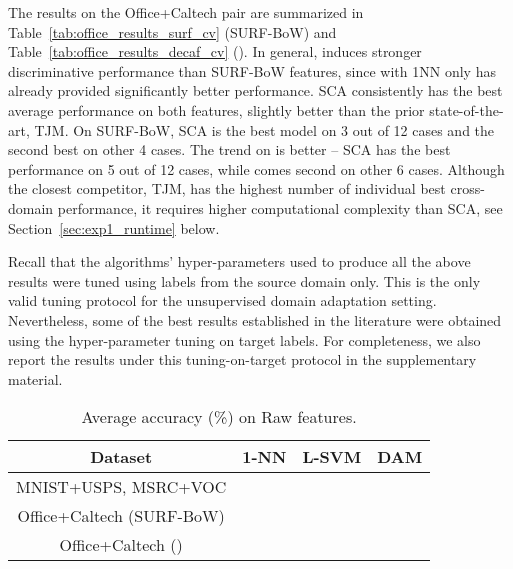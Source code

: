 \documentclass[10pt,journal,compsoc]{IEEEtran}
\begin{document}
The results on the Office+Caltech pair are summarized in Table~\ref{tab:office_results_surf_cv} (SURF-BoW) and Table~\ref{tab:office_results_decaf_cv} ().
In general,  induces stronger discriminative performance than SURF-BoW features, since  with 1NN only has already provided significantly better performance.
SCA consistently has the best average performance on both features, slightly better than the prior state-of-the-art, TJM. 
On SURF-BoW, SCA is the best model on 3 out of 12 cases and the second best on other 4 cases.
The trend on  is better -- SCA has the best performance on 5 out of 12 cases, while comes second on other 6 cases.
Although the closest competitor, TJM, has the highest number of individual best cross-domain performance, it requires higher computational complexity than SCA, see Section~\ref{sec:exp1_runtime} below.



Recall that the algorithms' hyper-parameters used to produce all the above results were tuned using labels from the source domain only.
This is the only valid tuning protocol for the unsupervised domain adaptation setting.
Nevertheless, some of the best results established in the literature were obtained using the hyper-parameter tuning on target labels.
For completeness, we also report the results under this tuning-on-target protocol in the supplementary material.


\begin{figure*}[htp]
	\centering
	 \label{fig:digobj}\quad
	 \label{fig:office_surf} \quad
	 \label{fig:office_decaf}
	\caption{L-SVM and DAM average performance accuracy (\%) relative to the performance on Raw features. The numbers on the top or bottom of the bars show the absolute accuracy. 
	The red line indicates the Raw baseline performance, see Table \ref{tab:raw_summ} for the exact numbers.
	}
	\label{fig:svm_dam}
\end{figure*}

\vspace{-1em}
\begin{table}[!htb]
\centering
\caption{Average accuracy (\%) on Raw features.}
\vspace{-1em}
\begin{tabular}{| c || c | c | c  | }
\hline
Dataset & 1-NN & L-SVM & DAM \\
\hline
MNIST+USPS, MSRC+VOC &  &  &  \\
Office+Caltech (SURF-BoW) &  &  &  \\
Office+Caltech () &  &  &  \\
\hline
\end{tabular}
\label{tab:raw_summ}
\end{table}
\end{document}
